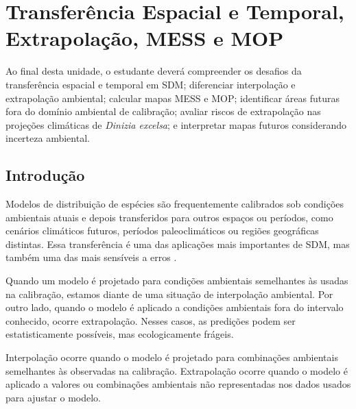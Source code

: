 \documentclass{ueap-sdm}
\begin{document}

\chapter[Transferência e extrapolação]{Transferência Espacial e Temporal, Extrapolação, MESS e MOP}

\begin{objetivos}
	Ao final desta unidade, o estudante deverá compreender os desafios da transferência espacial e temporal em SDM; diferenciar interpolação e extrapolação ambiental; calcular mapas MESS e MOP; identificar áreas futuras fora do domínio ambiental de calibração; avaliar riscos de extrapolação nas projeções climáticas de \textit{Dinizia excelsa}; e interpretar mapas futuros considerando incerteza ambiental.
\end{objetivos}

\section{Introdução}

Modelos de distribuição de espécies são frequentemente calibrados sob condições ambientais atuais e depois transferidos para outros espaços ou períodos, como cenários climáticos futuros, períodos paleoclimáticos ou regiões geográficas distintas. Essa transferência é uma das aplicações mais importantes de SDM, mas também uma das mais sensíveis a erros \parencite{peterson2011,araujo2012,yates2018transferability,zurell2020benchmarking}.

Quando um modelo é projetado para condições ambientais semelhantes às usadas na calibração, estamos diante de uma situação de interpolação ambiental. Por outro lado, quando o modelo é aplicado a condições ambientais fora do intervalo conhecido, ocorre extrapolação. Nesses casos, as predições podem ser estatisticamente possíveis, mas ecologicamente frágeis.

\begin{conceito}[title={\faBook\quad Interpolação versus extrapolação}]
	Interpolação ocorre quando o modelo é projetado para combinações ambientais semelhantes às observadas na calibração. Extrapolação ocorre quando o modelo é aplicado a valores ou combinações ambientais não representadas nos dados usados para ajustar o modelo.
\end{conceito}
\end{document}
